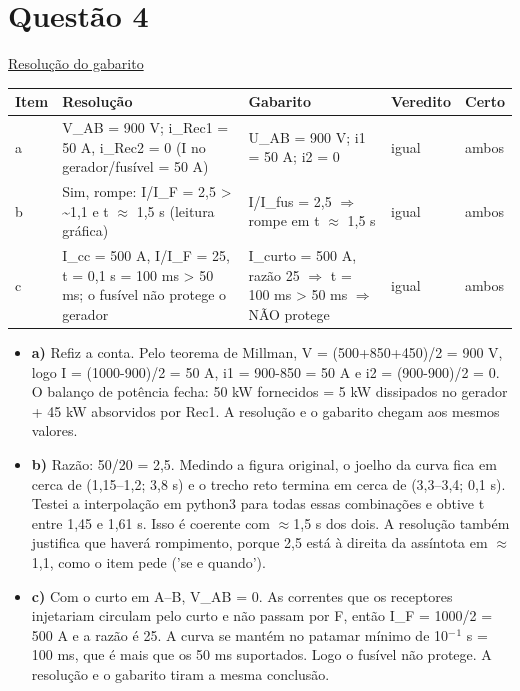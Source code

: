 \documentclass{article}%
\begin{document}
\section*{Questão 4}%
\href{https://poliedroresolve.sistemapoliedro.com.br/vestibulares/ime/2027/ime-2-fase-dia-2-27-10-2026-2-fase-dia-2/dissertativa-4-fisica-2-fase-dia-2-ime-2027}{Resolução do gabarito}\par\smallskip%
\begin{longtable}{@{}p{} p{} p{} p{} p{}@{}}\toprule Item & Resolução & Gabarito & Veredito & Certo \\ \midrule
a & V\_AB = 900 V; i\_Rec1 = 50 A, i\_Rec2 = 0 (I no gerador/fusível = 50 A) & U\_AB = 900 V; i1 = 50 A; i2 = 0 & igual & ambos \\
b & Sim, rompe: I/I\_F = 2,5 > \textasciitilde{}1,1 e t $\approx$ 1,5 s (leitura gráfica) & I/I\_fus = 2,5 $\Rightarrow$ rompe em t $\approx$ 1,5 s & igual & ambos \\
c & I\_cc = 500 A, I/I\_F = 25, t = 0,1 s = 100 ms > 50 ms; o fusível não protege o gerador & I\_curto = 500 A, razão 25 $\Rightarrow$ t = 100 ms > 50 ms $\Rightarrow$ NÃO protege & igual & ambos \\
\bottomrule\end{longtable}%
\begin{itemize}%
\item%
\textbf{a)} Refiz a conta. Pelo teorema de Millman, V = (500+850+450)/2 = 900 V, logo I = (1000-900)/2 = 50 A, i1 = 900-850 = 50 A e i2 = (900-900)/2 = 0. O balanço de potência fecha: 50 kW fornecidos = 5 kW dissipados no gerador + 45 kW absorvidos por Rec1. A resolução e o gabarito chegam aos mesmos valores.%
\item%
\textbf{b)} Razão: 50/20 = 2,5. Medindo a figura original, o joelho da curva fica em cerca de (1,15--1,2; 3,8 s) e o trecho reto termina em cerca de (3,3--3,4; 0,1 s). Testei a interpolação em python3 para todas essas combinações e obtive t entre 1,45 e 1,61 s. Isso é coerente com $\approx$1,5 s dos dois. A resolução também justifica que haverá rompimento, porque 2,5 está à direita da assíntota em $\approx$1,1, como o item pede ('se e quando').%
\item%
\textbf{c)} Com o curto em A--B, V\_AB = 0. As correntes que os receptores injetariam circulam pelo curto e não passam por F, então I\_F = 1000/2 = 500 A e a razão é 25. A curva se mantém no patamar mínimo de 10$^{-}$$^{1}$ s = 100 ms, que é mais que os 50 ms suportados. Logo o fusível não protege. A resolução e o gabarito tiram a mesma conclusão.%
\end{itemize}%
\end{document}
